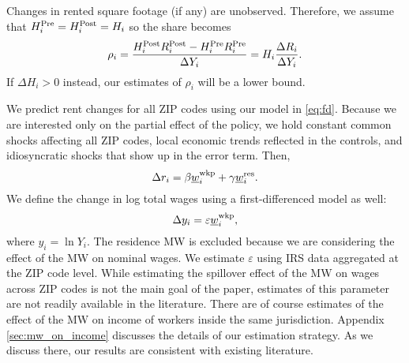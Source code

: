 Changes in rented square footage (if any) are unobserved.
Therefore, we assume that
$H^{\text{Pre}}_i = H^{\text{Post}}_i = H_i$ 
so the share becomes
\begin{equation}\label{eq:share_pocketed}
    \rho_i = \frac{H^{\text{Post}}_i R^{\text{Post}}_i - H^{\text{Pre}}_i R^{\text{Pre}}_i}{\Delta Y_i} = 
                H_i \frac{\Delta R_i}{\Delta Y_i} .
\end{equation}
If $\Delta H_i > 0$ instead, our estimates of $\rho_i$ will be a lower bound.

We predict rent changes for all ZIP codes using our model in \eqref{eq:fd}.
Because we are interested only on the partial effect of the policy, we
hold constant common shocks affecting all ZIP codes,
local economic trends reflected in the controls, and
idiosyncratic shocks that show up in the error term.
Then,
\begin{equation}\label{eq:cf_rents_model}
    \Delta r_i = \beta \underline{w}_i^{\text{wkp}} + \gamma \underline{w}_i^{\text{res}} .
\end{equation}
We define the change in log total wages using a first-differenced model as well:
\begin{equation}\label{eq:cf_wages_model}
    \Delta y_i = \varepsilon \underline{w}_i^{\text{wkp}} ,
\end{equation}
where $y_i=\ln Y_i$.
The residence MW is excluded because we are considering the effect of the MW on 
nominal wages.
We estimate $\varepsilon$ using IRS data aggregated at the ZIP code level.
While estimating the spillover effect of the MW on wages across ZIP codes is 
not the main goal of the paper, 
estimates of this parameter are not readily available in the literature.
There are of course estimates of the effect of the MW on income of workers
inside the same jurisdiction.
Appendix \ref{sec:mw_on_income} discusses the details of our estimation 
strategy.
As we discuss there, our results are consistent with existing literature.

%
%
%

